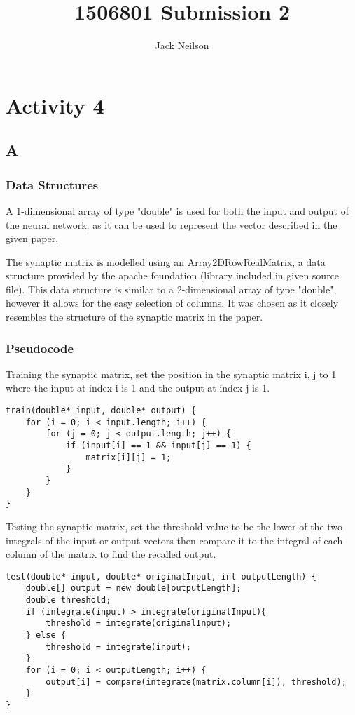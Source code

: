 \documentclass{article}
\begin{document}
\title{1506801 Submission 2}
\author{Jack Neilson}
\maketitle
\newpage
\obeylines
\section*{Activity 4}
\subsection*{A}
\subsubsection*{Data Structures}
A 1-dimensional array of type "double" is used for both the input and output of the neural network, as it can be used to represent the vector described in the given paper. 

The synaptic matrix is modelled using an Array2DRowRealMatrix, a data structure provided by the apache foundation (library included in given source file). This data structure is similar to a 2-dimensional array of type "double", however it allows for the easy selection of columns. It was chosen as it closely resembles the structure of the synaptic matrix in the paper.

\subsubsection*{Pseudocode}
Training the synaptic matrix, set the position in the synaptic matrix i, j to 1 where the input at index i is 1 and the output at index j is 1.
\begin{lstlisting}
train(double* input, double* output) {
	for (i = 0; i < input.length; i++) {
		for (j = 0; j < output.length; j++) {
			if (input[i] == 1 && input[j] == 1) {
				matrix[i][j] = 1;
			}
		}
	}
}
\end{lstlisting}

Testing the synaptic matrix, set the threshold value to be the lower of the two integrals of the input or output vectors then compare it to the integral of each column of the matrix to find the recalled output.
\begin{lstlisting}
test(double* input, double* originalInput, int outputLength) {
	double[] output = new double[outputLength];
	double threshold;
	if (integrate(input) > integrate(originalInput){
		threshold = integrate(originalInput);
	} else {
		threshold = integrate(input);
	}
	for (i = 0; i < outputLength; i++) {
		output[i] = compare(integrate(matrix.column[i]), threshold);
	}
}
\end{lstlisting}
\end{document}

